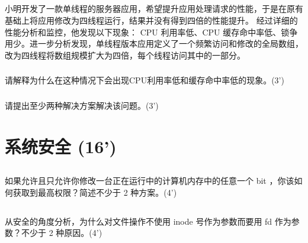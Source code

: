 \documentclass[a4paper,12pt]{article}
\newcommand{\score}[1]{(#1')}
\begin{document}
\subsection{}

小明开发了一款单线程的服务器应用，希望提升应用处理请求的性能，于是在原有基础上将应用修改为四线程运行，结果并没有得到四倍的性能提升。
经过详细的性能分析和监控，他发现以下现象： CPU 利用率低、CPU 缓存命中率低、锁争用少。进一步分析发现，单线程版本应用定义了一个频繁访问和修改的全局数组，改为四线程将数组规模扩大为四倍，每个线程访问其中的一部分。

\subsubsection{}

请解释为什么在这种情况下会出现CPU利用率低和缓存命中率低的现象。\score{3}

\begin{answer}
  \lipsum[3]
\end{answer}

\subsubsection{}

请提出至少两种解决方案解决该问题。\score{3}

\begin{answer}
  \lipsum[3]
\end{answer}

\section{系统安全 \score{16}}

\subsection{}

如果允许且只允许你修改一台正在运行中的计算机内存中的任意一个 bit ，你该如何获取到最高权限？简述不少于 2 种方案。\score{4}

\begin{answer}
  \lipsum[3]
\end{answer}

\subsection{}

从安全的角度分析，为什么对文件操作不使用 inode 号作为参数而要用 fd 作为参数？不少于 2 种原因。\score{4}
\end{document}
